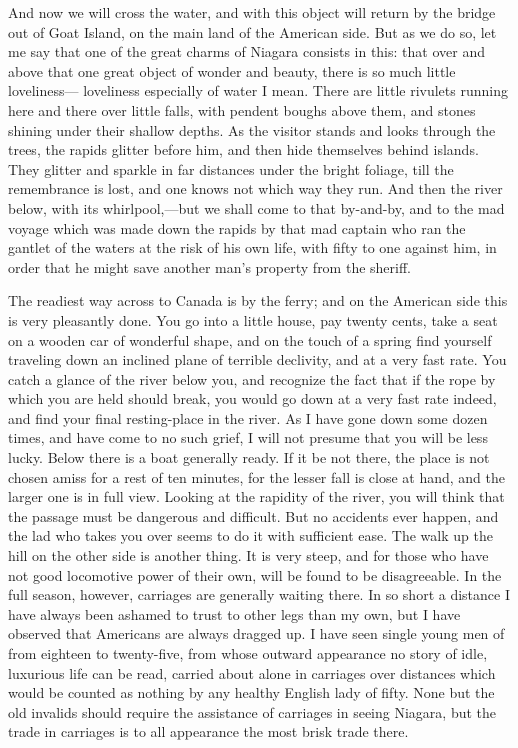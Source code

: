 And now we will cross the water, and with this object will return
by the bridge out of Goat Island, on the main land of the American
side.  But as we do so, let me say that one of the great charms of
Niagara consists in this: that over and above that one great object
of wonder and beauty, there is so much little loveliness---%
loveliness especially of water I mean.  There are little rivulets
running here and there over little falls, with pendent boughs above
them, and stones shining under their shallow depths.  As the
visitor stands and looks through the trees, the rapids glitter
before him, and then hide themselves behind islands.  They glitter
and sparkle in far distances under the bright foliage, till the
remembrance is lost, and one knows not which way they run.  And
then the river below, with its whirlpool,---but we shall come to
that by-and-by, and to the mad voyage which was made down the
rapids by that mad captain who ran the gantlet of the waters at the
risk of his own life, with fifty to one against him, in order that
he might save another man's property from the sheriff.

The readiest way across to Canada is by the ferry; and on the
American side this is very pleasantly done.  You go into a little
house, pay twenty cents, take a seat on a wooden car of wonderful
shape, and on the touch of a spring find yourself traveling down an
inclined plane of terrible declivity, and at a very fast rate.  You
catch a glance of the river below you, and recognize the fact that
if the rope by which you are held should break, you would go down
at a very fast rate indeed, and find your final resting-place in
the river.  As I have gone down some dozen times, and have come to
no such grief, I will not presume that you will be less lucky.
Below there is a boat generally ready.  If it be not there, the
place is not chosen amiss for a rest of ten minutes, for the lesser
fall is close at hand, and the larger one is in full view.  Looking
at the rapidity of the river, you will think that the passage must
be dangerous and difficult.  But no accidents ever happen, and the
lad who takes you over seems to do it with sufficient ease.  The
walk up the hill on the other side is another thing.  It is very
steep, and for those who have not good locomotive power of their
own, will be found to be disagreeable.  In the full season,
however, carriages are generally waiting there.  In so short a
distance I have always been ashamed to trust to other legs than my
own, but I have observed that Americans are always dragged up.  I
have seen single young men of from eighteen to twenty-five, from
whose outward appearance no story of idle, luxurious life can be
read, carried about alone in carriages over distances which would
be counted as nothing by any healthy English lady of fifty.  None
but the old invalids should require the assistance of carriages in
seeing Niagara, but the trade in carriages is to all appearance the
most brisk trade there.

